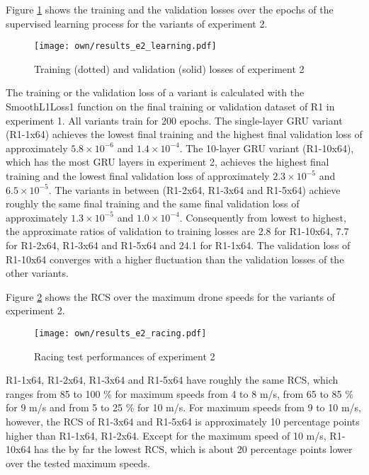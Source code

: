 Figure \ref{fig:e2_learn} shows the 
training and the validation losses
over the epochs of the supervised learning process for the variants of experiment 2.
\begin{figure}
    \centering
    \texttt{[image: own/results\_e2\_learning.pdf]}
    \caption[
        Training and validation losses of experiment 2
    ]{
        Training (dotted) and validation (solid) losses of experiment 2
    \label{fig:e2_learn}}
\end{figure}
The training or the validation loss of a variant is calculated with the SmoothL1Loss1 function 
on the final training or validation dataset of R1 in experiment 1.
All variants train for 200 epochs.
The single-layer GRU variant (R1-1x64)
achieves the lowest final training and the highest final validation loss
of approximately $5.8\times 10^{-6}$ and $1.4\times 10^{-4}$.
The 10-layer GRU variant (R1-10x64),
which has the most GRU layers in experiment 2,
achieves the highest final training and the lowest final validation loss
of approximately $2.3\times 10^{-5}$ and $6.5\times 10^{-5}$.
The variants in between (R1-2x64, R1-3x64 and R1-5x64)
achieve roughly the same final training and the same final validation loss
of approximately $1.3\times 10^{-5}$ and $1.0\times 10^{-4}$.
Consequently from lowest to highest, the approximate
ratios of validation to training losses are 2.8 for R1-10x64, 7.7 for R1-2x64, R1-3x64 and R1-5x64
and 24.1 for R1-1x64.
The validation loss of R1-10x64
converges with a higher fluctuation than the validation losses of the other variants.


Figure \ref{fig:e2_rcs} shows the RCS over the maximum drone speeds
for the variants of experiment 2.
\begin{figure}
    \centering
    \texttt{[image: own/results\_e2\_racing.pdf]}
    \caption[
        Racing test performances of experiment 2
    ]{
        Racing test performances of experiment 2
    \label{fig:e2_rcs}}
\end{figure}
R1-1x64, R1-2x64, R1-3x64 and R1-5x64
have roughly the same RCS,
which ranges from 85 to 100 \%
for maximum speeds from 4 to 8 m/s,
from 65 to 85 \% for 9 m/s and 
from 5 to 25 \% for 10 m/s.
For maximum speeds from 9 to 10 m/s, however,
the RCS of R1-3x64 and R1-5x64 is approximately 10 percentage points higher than R1-1x64, R1-2x64.
Except for the maximum speed of 10 m/s,
R1-10x64 has the by far the lowest RCS,
which is about 20 percentage points lower over the tested maximum speeds.



